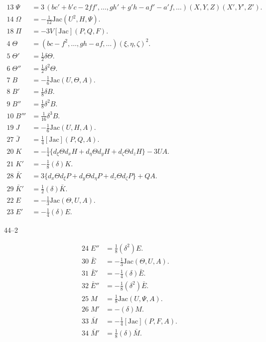 \documentclass[11pt,a4paper]{article}
\begin{document}
\begin{align*}
  13\;\Psi &= 3\,(bc'+b'c-2ff',\ldots,gh'+g'h-af'-a'f,\ldots)(X,Y,Z)(X',Y',Z').\\
  14\;\Omega &= -\tfrac{1}{12}\mathrm{Jac}(U^{2},H,\Psi).\\
  18\;\Pi &= -3V[\mathrm{Jac}](P,Q,F).\\[4pt]
  4\;\Theta &= (bc-f^{2},\ldots,gh-af,\ldots)(\xi,\eta,\zeta)^{2}.\\
  5\;\Theta' &= \tfrac{1}{2}\delta\Theta.\\
  6\;\Theta'' &= \tfrac{1}{2}\delta^{2}\Theta.\\[4pt]
  7\;B &= -\tfrac{1}{6}\mathrm{Jac}(U,\Theta,A).\\
  8\;B' &= \tfrac{1}{8}\delta B.\\
  9\;B'' &= \tfrac{1}{8}\delta^{2}B.\\
  10\;B''' &= \tfrac{1}{16}\delta^{3}B.\\[4pt]
  19\;J &= -\tfrac{1}{6}\mathrm{Jac}(U,H,A).\\
  27\;\bar J &= \tfrac{1}{4}[\mathrm{Jac}](P,Q,A).\\[4pt]
  20\;K &= -\tfrac{1}{4}\{d_{\xi}\Theta d_{x}H+d_{\eta}\Theta d_{y}H+d_{\zeta}\Theta d_{z}H\}-3UA.\\
  21\;K' &= -\tfrac{1}{8}(\delta)K.\\
  28\;\bar K &= 3\{d_{x}\Theta d_{\xi}P+d_{y}\Theta d_{\eta}P+d_{z}\Theta d_{\zeta}P\}+QA.\\
  29\;\bar K' &= \tfrac{1}{2}(\delta)\bar K.\\[4pt]
  22\;E &= -\tfrac{1}{3}\mathrm{Jac}(\Theta,U,A).\\
  23\;E' &= -\tfrac{1}{4}(\delta)E.
\end{align*}

\hfill 44--2

\newpage
\begin{align*}
  24\;E'' &= \tfrac{1}{8}(\delta^{2})E.\\
  30\;\bar E &= -\tfrac{1}{3}\mathrm{Jac}(\Theta,U,A).\\
  31\;\bar E' &= -\tfrac{1}{4}(\delta)\bar E.\\
  32\;\bar E'' &= -\tfrac{1}{8}(\delta^{2})\bar E.\\
  25\;M &= \tfrac{1}{8}\mathrm{Jac}(U,\Psi,A).\\
  26\;M' &= -(\delta)M.\\
  33\;\bar M &= -\tfrac{1}{4}[\mathrm{Jac}](P,F,A).\\
  34\;\bar M' &= \tfrac{1}{8}(\delta)\bar M.
\end{align*}
\end{document}
